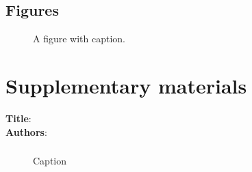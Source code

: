 \documentclass[12pt]{article}
\begin{document}
\clearpage
\subsection*{Figures}

\begin{figure}[h!]
  \begin{center}
    \caption{A figure with caption. }
    \label{fig:concept}
  \end{center}
\end{figure}


























\clearpage 

\newcommand{\beginsupplement}{%
        \setcounter{page}{1}
        \setcounter{table}{0}
        \renewcommand{\thetable}{S\arabic{table}}%
        \setcounter{figure}{0}
        \renewcommand{\thefigure}{S\arabic{figure}}%
        }

\section*{Supplementary materials}

\begin{center}
\textbf{Title}:       \\
\textbf{Authors}:     \\
\end{center}

\beginsupplement


\subsubsection*{}
 

\begin{figure}[h!]
  \begin{center}
    \caption{Caption }
    \label{fig:label}
  \end{center}
\end{figure}
\end{document}
